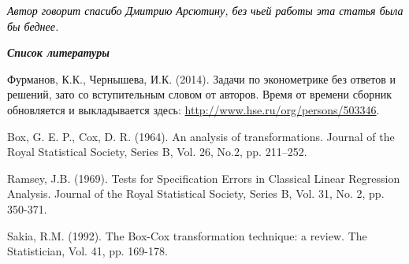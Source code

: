 \documentclass[a4paper]{article}
\begin{document}
\bigskip


\bigskip

\textit{\textcolor{black}{Автор говорит спасибо Дмитрию Арсютину, без чьей работы эта статья была бы беднее.}}


\bigskip

{\centering\bfseries\itshape
Список литературы
\par}

Фурманов, К.К., Чернышева, И.К. (2014). Задачи по эконометрике без ответов и решений, зато со вступительным словом от авторов. Время от времени сборник обновляется и выкладывается здесь: \url{http://www.hse.ru/org/persons/503346}.

Box, G. E. P., Cox, D. R. (1964). An analysis of transformations. Journal of the Royal Statistical Society, Series B, Vol. 26, No.2, pp. 211–252.

Ramsey, J.B. (1969). Tests for Specification Errors in Classical Linear Regression Analysis. Journal of the Royal Statistical Society, Series B, Vol. 31, No. 2, pp. 350-371. 

Sakia, R.M. (1992). The Box-Cox transformation technique: a review. The Statistician, Vol. 41, pp. 169-178.
\end{document}
